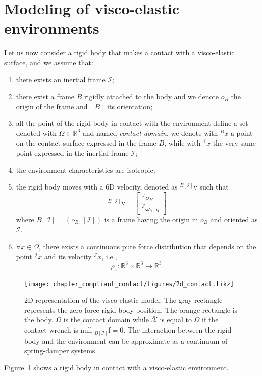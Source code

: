 \section{Modeling of visco-elastic environments  \label{sec:contact_mode_compliant}}

Let us now consider a rigid body that makes a contact with a visco-elastic surface, and we assume that:
\begin{enumerate}
    \item there exists an inertial frame $\mathcal{I}$;
    \item there exist a frame $B$ rigidly attached to the body and we denote $o_B$ the origin of the frame and $[B]$ its orientation;
    \item all the point of the rigid body in contact with the environment define a set denoted with $\Omega \in \mathbb{R}^3$ and named \emph{contact domain}, we denote with ${}^B x$ a point on the contact surface expressed in the frame $B$, while with ${}^\mathcal{I} x$ the very same point expressed in the inertial frame $\mathcal{I}$;
    \item the environment characteristics are isotropic;
    \item the rigid body moves with a 6D velocity, denoted as ${}^{B[\mathcal{I}]} \mathrm{v}$ such that 
    \begin{equation}
    {}^{B[\mathcal{I}]} \mathrm{v} = 
    \begin{bmatrix}
       {}^\mathcal{I}\dot{o}_B \\
       {}^\mathcal{I}\omega_{\mathcal{I},B}
    \end{bmatrix} 
    \end{equation}
   where $B[\mathcal{I}] = \left(o_B, [\mathcal{I}]\right)$ is a frame having the origin in $o_B$ and oriented as $\mathcal{I}$.
    \item  $\forall x \in \Omega$, there exists a continuous pure force distribution that depends on the point ${}^\mathcal{I} x$ and its velocity ${}^\mathcal{I} \dot{x}$, i.e.,
    \begin{equation}
        \label{eq:compliant_model_rho_definition_subscript}
        \rho_x : \mathbb{R}^3 \times \mathbb{R}^3  \rightarrow \mathbb{R}^3.
    \end{equation}
\end{enumerate}
\begin{figure}[t]
    \centering
	\texttt{[image: chapter\_compliant\_contact/figures/2d\_contact.tikz]}
	\caption[The visco-elastic model: a 2D representation.]{2D representation of the visco-elastic model. The gray rectangle represents the zero-force rigid body position. The orange rectangle is the body. $\Omega$ is the contact domain while $\bar{\mathcal{X}}$ is equal to $\Omega$ if the contact wrench is null ${}_{B[\mathcal{I}]} \mathrm{f} = 0$. The interaction between the rigid body and the environment can be approximate as a continuum of spring-damper systems. }
	\label{fig:2d_contact_model}
\end{figure}
Figure~\ref{fig:2d_contact_model} shows a rigid body in contact with a visco-elastic environment.

